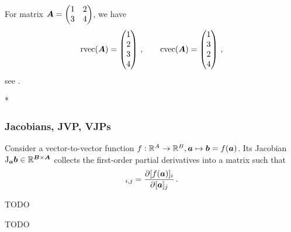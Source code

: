 \begin{paracol}{2}
  \begin{example}
    For matrix
    \(
    {\bm{A}} = \begin{pmatrix}
            1 & 2 \\
            3 & 4
          \end{pmatrix}
          \), we have
          \begin{equation*}
            \operatorname{rvec}({\bm{A}})
            =
            \begin{pmatrix}
              1 \\ 2 \\ 3 \\ 4
            \end{pmatrix}\,,
            \qquad
            \operatorname{cvec}({\bm{A}})
            =
            \begin{pmatrix}
              1 \\ 3 \\ 2 \\ 4
            \end{pmatrix}\,,
          \end{equation*}
          see .
        \end{example}

        \switchcolumn[1]

        \switchcolumn[0]*
        \subsubsection{Jacobians, JVP, VJPs}

        \begin{definition}[Jacobian]
          Consider a vector-to-vector function $f: {\mathbb{R}}^A \to {\mathbb{R}}^B, {\bm{a}} \mapsto {\bm{b}} = f({\bm{a}})$.
          Its Jacobian $\mathrm{J}_{{\bm{a}}}{\bm{b}} \in {\mathbb{R}}^{{\bm{B}} \times {\bm{A}}}$ collects the first-order partial derivatives into a matrix such that
          \begin{align*}
            [\jac_{\va} \vb]_{i,j} = \frac{\partial [f(\va)]_i}{\partial [\va]_j}\,.
          \end{align*}
        \end{definition}

        \begin{definition}
          TODO
        \end{definition}

        \begin{definition}
          TODO
        \end{definition}


\end{paracol}
